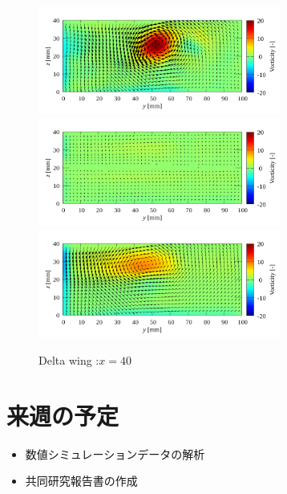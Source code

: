 \documentclass[twocolumn,a4j]{jsarticle}
\begin{document}
\newpage
\begin{figure}[htbp]
  \centering
  {
    \includegraphics[keepaspectratio, width=80mm]{../images/Simulation/Compare/experiment_x=40.png}
    \includegraphics[keepaspectratio, width=80mm]{../images/Simulation/Compare/simulation_x=40.png}
    \includegraphics[keepaspectratio, width=80mm]{../images/Simulation/Compare/simulation2_x=40.png}
  }
  \caption{Delta wing :$x=40$}
\end{figure}


\section{来週の予定}
\begin{itemize}
  \item 数値シミュレーションデータの解析
  \item 共同研究報告書の作成
\end{itemize}
\end{document}
